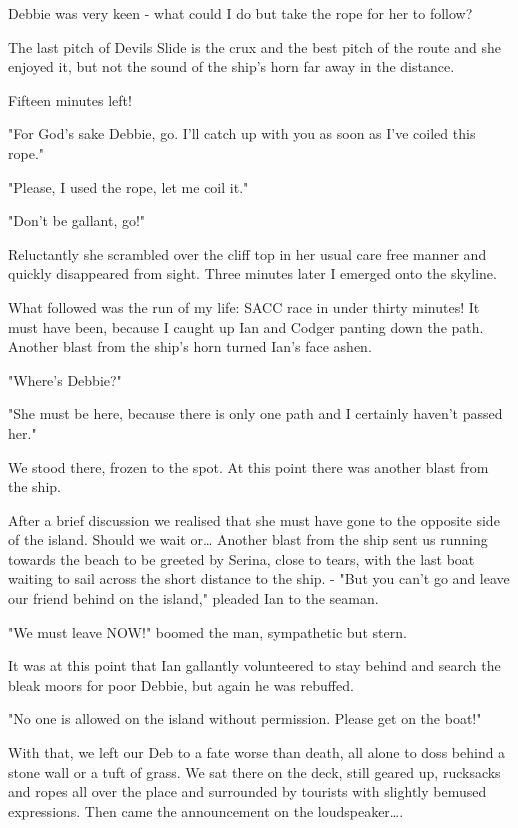 \documentclass[a5paper,openany,font 10pt]{scrbook}
\begin{document}
Debbie was very keen - what could I do but take the rope for
her to follow?

The last pitch of    Devils Slide    is the crux and the best
pitch of the route and she enjoyed it, but not the sound of the
ship's horn far away in the distance.

Fifteen minutes left!

"For God's sake Debbie,  go. I'll catch up with you as soon
as I've coiled this rope."

"Please, I used the rope, let me coil it."

"Don't be gallant, go!"

Reluctantly she scrambled over the cliff top in her usual
care free manner and quickly disappeared from sight. Three
minutes later I emerged onto the skyline.

What followed was the run of my life: SACC race in under
thirty minutes!  It must have been, because I caught up Ian and
Codger panting down the path.  Another blast from the ship's horn
turned Ian's face ashen.

"Where's Debbie?"

"She must be here, because there is only one path and I
certainly haven't passed her."

We stood there, frozen to the spot. At this point there was
another blast from the ship.

After a brief discussion we realised that she must have gone
to the opposite side of the island. Should we wait or\ldots{} Another
blast from the ship sent us running towards the beach to be
greeted by Serina, close to tears, with the last boat waiting to
sail across the short distance to the ship. -
"But you can't go and leave our friend behind on the
island," pleaded Ian to the seaman.

"We must leave NOW!" boomed the man, sympathetic but stern.

It was at this point that Ian gallantly volunteered to stay
behind and search the bleak moors for poor Debbie, but again he
was rebuffed.

"No one is allowed on the island without permission. Please
get on the boat!"

With that, we left our Deb to a fate worse than death, all
alone to doss behind a stone wall or a tuft of grass. We sat
there on the deck, still geared up, rucksacks and ropes all over
the place and surrounded by tourists with slightly bemused
expressions. Then came the announcement on the loudspeaker\ldots{}.
\end{document}
